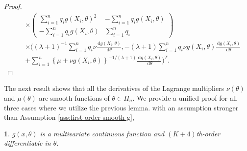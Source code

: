 \documentclass[oneside,english]{amsbook}
\numberwithin{section}{chapter}
\numberwithin{equation}{section}
\numberwithin{figure}{section}
\theoremstyle{plain}
\theoremstyle{plain}
\newtheorem{assumption}{\protect\assumptionname}
\theoremstyle{definition}
\theoremstyle{plain}
\theoremstyle{plain}
\theoremstyle{remark}
\theoremstyle{definition}
\theoremstyle{definition}
\newcommand{\diff}{\,\mathrm{d}}
\providecommand{\assumptionname}{Assumption}
\begin{document}
\begin{proof}
\begin{eqnarray}
 &  & \times\left(\begin{array}{cc}
\sum_{i=1}^{n}q_{i}g\left(X_{i},\theta\right)^{2} & -\sum_{i=1}^{n}q_{i}g\left(X_{i},\theta\right)\\
-\sum_{i=1}^{n}q_{i}g\left(X_{i},\theta\right) & \sum_{i=1}^{n}q_{i}
\end{array}\right)\nonumber \\
& & \times \Bigg(\left(\lambda+1\right)^{-1}\sum_{i=1}^{n}q_{i}\nu\frac{\diff g\left(X_{i},\theta\right)}{\diff\theta}, -\left(\lambda+1\right)\sum_{i=1}^{n}q_{i}\nu g\left(X_{i},\theta\right)\frac{\diff g\left(X_{i},\theta\right)}{\diff\theta}\nonumber \\
 &  & 
+\sum_{i=1}^{n}\left\{ \mu+\nu g\left(X_{i},\theta\right)\right\} ^{-1/(\lambda+1)}\frac{\diff g\left(X_{i},\theta\right)}{\diff\theta}
\Bigg)^T .\label{eq:first-der-lag-mul-crel}
\end{eqnarray}

\end{proof}
The next result shows that all the derivatives of the Lagrange multipliers
$\nu\left(\theta\right)$ and $\mu\left(\theta\right)$ are smooth
functions of $\theta\in H_n$. We provide a unified proof for all three
cases where we utilize the previous lemma. with an assumption stronger than Assumption \ref{ass:first-order-smooth-g},
\begin{assumption}
\label{ass:high-order-smooth-g}
$g(x,\theta)$ is a multivariate continuous function and $(K+4)$th-order differentiable in $\theta$.
\end{assumption}
\end{document}
